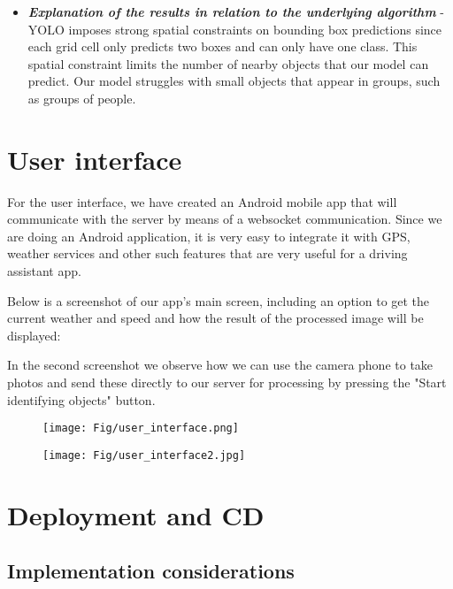 \documentclass[runningheads,a4paper,11pt]{report}
\begin{document}
\begin{itemize}
	\item \textbf{\emph{Explanation of the results in relation to the underlying algorithm}} - YOLO imposes strong spatial constraints on bounding
box predictions since each grid cell only predicts two boxes and can only have one class. This spatial constraint limits the number of nearby objects that our model can predict. Our model struggles with small objects that appear in groups, such as groups of people.
\end{itemize}

\section{User interface}
For the user interface, we have created an Android mobile app that will communicate with the server by means of a websocket communication. Since we are doing an Android application, it is very easy to integrate it with GPS, weather services and other such features that are very useful for a driving assistant app.

Below is a screenshot of our app's main screen, including an option to get the current weather and speed and how the result of the processed image will be displayed:

In the second screenshot we observe how we can use the camera phone to take photos and send these directly to our server for processing by pressing the "Start identifying objects" button.

\begin{figure}[htbp]
\centering
\begin{minipage}{.5\textwidth}
  \centering
  \texttt{[image: Fig/user\_interface.png]}
  \label{fig:userInterface1}
\end{minipage}%
\begin{minipage}{.5\textwidth}
  \centering
  \texttt{[image: Fig/user\_interface2.jpg]}
  \label{fig:userInterface2}
\end{minipage}
\end{figure}

\section{Deployment and CD}
\label{section:deploy}

\subsection{Implementation considerations}
\end{document}
